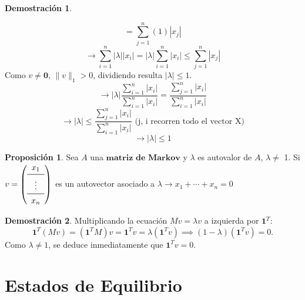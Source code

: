 \documentclass[11pt,a4paper]{article}
\theoremstyle{definition}
\newtheorem{proposicion}{Proposición}
\newtheorem{demostracion}{Demostración}
\begin{document}
\begin{demostracion}
\begin{itemize}
\[                = 
                    \sum_{j=1}^{n} \left( 1 \right) |x_j|  
            \] 
                \[
                \rightarrow 
                    \sum_{i=1}^{n} |\lambda||x_i| 
                =
                    |\lambda| \sum_{i=1}^{n} |x_i| 
                \leq 
                    \sum_{j=1}^{n} |x_j|  
            \]
            Como $v \neq \mathbf{0}$, $\|v\|_1 > 0$, dividiendo resulta $|\lambda| \le 1$.
            \[
                \rightarrow
                    |\lambda| \frac{\sum_{i=1}^{n} |x_i|}{\sum_{i=1}^{n} |x_i|}
                = 
                    \frac{\sum_{j=1}^{n} |x_i|}{\sum_{i=1}^{n} |x_i|}
            \]
            \[
                \rightarrow
                    |\lambda|
                \leq
                    \frac{\sum_{j=1}^{n} |x_i|}{\sum_{i=1}^{n} |x_i|} \text{  (j, i recorren todo el vector X)}
            \]
                \[
                \rightarrow
                    |\lambda|
                \leq
                    1 
            \]
    \end{itemize}
\end{demostracion}

\begin{proposicion}
    Sea $A$ una $\textbf{matriz de Markov}$ y $\lambda$ es autovalor de $A$, $\lambda \neq$ 1. 
    \newline
    Si $v = \left( 
                \begin{array}{c}
                    x_1 \\
                    \midrule
                    \vdots \\
                    \midrule
                    x_n
                \end{array}
            \right)$ es un autovector asociado a $\lambda \rightarrow x_1+\cdots+x_n = 0 $    
\end{proposicion}

\begin{demostracion}
    Multiplicando la ecuación $Mv = \lambda v$ a izquierda por $\mathbf{1}^T$:
    \[
        \mathbf{1}^T (Mv) = (\mathbf{1}^T M)v = \mathbf{1}^T v = \lambda (\mathbf{1}^T v) \implies (1 - \lambda)(\mathbf{1}^T v) = 0.
    \]
    Como $\lambda \neq 1$, se deduce inmediatamente que $\mathbf{1}^T v = 0$.    
\end{demostracion}

\section{Estados de Equilibrio}
\end{document}
